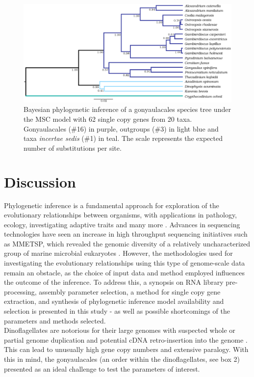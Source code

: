 \documentclass[fleqn,10pt,lineno]{wlpeerj} %
\begin{document}
\begin{figure}[ht]
\centering
\includegraphics[width=\linewidth]{gonya-figs/Aug2-20-taxa-combined-fig-MCC-trees.png} 
\caption{Bayesian phylogenetic inference of a gonyaulacales species tree under the MSC model with 62 single copy genes from 20 taxa. Gonyaulacales (\#16) in purple, outgroups (\#3) in light blue and taxa \textit{incertae sedis} (\#1) in teal. The scale represents the expected number of substitutions per site.} 
\label{fig:SCmscBI}
\end{figure} 


\section*{Discussion}
Phylogenetic inference is a fundamental approach for exploration of the evolutionary relationships between organisms, with applications in pathology, ecology, investigating adaptive traits and many more \cite{heath2008taxon}.
Advances in sequencing technologies have seen an increase in high throughput sequencing initiatives such as MMETSP, which revealed the genomic diversity of a relatively uncharacterized group of marine microbial eukaryotes \cite{keeling2014marine}. 
However, the methodologies used for investigating the evolutionary relationships using this type of genome-scale data remain an obstacle, as the choice of input data and method employed influences the outcome of the inference. 
To address this, a synopsis on RNA library pre-processing, assembly parameter selection, a method for single copy gene extraction, and synthesis of phylogenetic inference model availability and selection is presented in this study - as well as possible shortcomings of the parameters and methods selected. \\
Dinoflagellates are notorious for their large genomes with suspected whole or partial genome duplication and potential cDNA retro-insertion into the genome \cite{van2009florida,beauchemin2012dinoflagellate,slamovits2008widespread,hou2009distinct,lin2011genomic}. 
This can lead to unusually high gene copy numbers and extensive paralogy. 
With this in mind, the gonyaulacales (an order within the dinoflagellates, see box 2) presented as an ideal challenge to test the parameters of interest.
\end{document}
